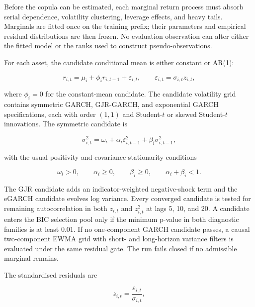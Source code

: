 Before the copula can be estimated, each marginal return process must absorb serial dependence, volatility clustering, leverage effects, and heavy tails. Marginals are fitted once on the training prefix; their parameters and empirical residual distributions are then frozen. No evaluation observation can alter either the fitted model or the ranks used to construct pseudo-observations.

For each asset, the candidate conditional mean is either constant or AR(1):

\begin{equation}
r_{i,t}=\mu_i+\phi_i r_{i,t-1}+\varepsilon_{i,t},\qquad
\varepsilon_{i,t}=\sigma_{i,t}z_{i,t},
\label{eq:ar1_mean}
\end{equation}

where $\phi_i=0$ for the constant-mean candidate. The candidate volatility grid contains symmetric GARCH, GJR-GARCH, and exponential GARCH specifications, each with order $(1,1)$ and Student-$t$ or skewed Student-$t$ innovations. The symmetric candidate is

\begin{equation}
\sigma_{i,t}^2=\omega_i+\alpha_i\varepsilon_{i,t-1}^2+\beta_i\sigma_{i,t-1}^2,
\label{eq:garch11}
\end{equation}

with the usual positivity and covariance-stationarity conditions

\begin{equation}
\omega_i>0,\qquad \alpha_i\geq0,\qquad\beta_i\geq0,
\qquad\alpha_i+\beta_i<1.
\label{eq:garch_constraints}
\end{equation}

The GJR candidate adds an indicator-weighted negative-shock term and the eGARCH candidate evolves log variance. Every converged candidate is tested for remaining autocorrelation in both $z_{i,t}$ and $z_{i,t}^2$ at lags 5, 10, and 20. A candidate enters the BIC selection pool only if the minimum p-value in both diagnostic families is at least 0.01. If no one-component GARCH candidate passes, a causal two-component EWMA grid with short- and long-horizon variance filters is evaluated under the same residual gate. The run fails closed if no admissible marginal remains.

The standardised residuals are

\begin{equation}
z_{i,t}=\frac{\varepsilon_{i,t}}{\sigma_{i,t}},
\label{eq:standardized_residuals}
\end{equation}

